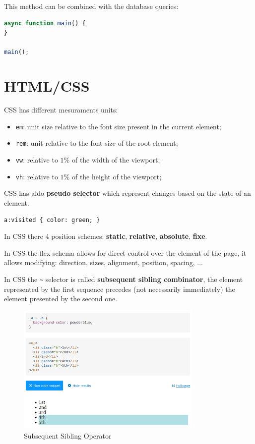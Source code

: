 \documentclass[12pt]{article}
\begin{document}
\hfill

This method can be combined with the database queries:
\begin{lstlisting}[language=js]
async function main() {
}

main();
\end{lstlisting}




\newpage
\section{HTML/CSS}

CSS has different mesuraments units:
\begin{itemize}
  \item \texttt{em}: unit size relative to the font size present in the current element;
  \item \texttt{rem}: unit relative to the font size of the root element;
  \item \texttt{vw}: relative to $1\%$ of the width of the viewport;
  \item \texttt{vh}: relative to $1\%$ of the height of the viewport;
\end{itemize}
CSS has aldo \textbf{pseudo selector} which represent changes based on the state of an element.
\begin{lstlisting}[language=html]
a:visited { color: green; }
\end{lstlisting}
In CSS there 4 position schemes: \textbf{static}, \textbf{relative}, \textbf{absolute}, \textbf{fixe}.

In CSS the flex schema allows for direct control over the element of the page, it allows modifying: direction, sizes, alignment, position, spacing, ...

In CSS the \texttt{\~} selector is called \textbf{subsequent sibling combinator}, the element represented by the first sequence precedes (not necessarily immediately) the element presented by the second one.
\begin{figure}[H]
  \centering
  \includegraphics[width=0.8\textwidth]{subsequent-sibling-operator.png}
  \caption{Subsequent Sibling Operator}
  \label{fig:subsequent-sibling-operator}
\end{figure}
\end{document}
